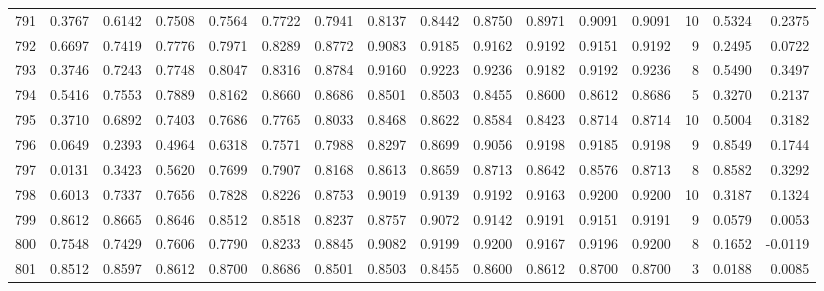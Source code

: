 \begin{tabular}{lrrrrrrrrrrrrrrr}
791 &      0.3767 &  0.6142 &  0.7508 &  0.7564 &  0.7722 &  0.7941 &  0.8137 &  0.8442 &  0.8750 &  0.8971 &   0.9091 &     0.9091 &     10 &                    0.5324 &                     0.2375 \\
792 &      0.6697 &  0.7419 &  0.7776 &  0.7971 &  0.8289 &  0.8772 &  0.9083 &  0.9185 &  0.9162 &  0.9192 &   0.9151 &     0.9192 &      9 &                    0.2495 &                     0.0722 \\
793 &      0.3746 &  0.7243 &  0.7748 &  0.8047 &  0.8316 &  0.8784 &  0.9160 &  0.9223 &  0.9236 &  0.9182 &   0.9192 &     0.9236 &      8 &                    0.5490 &                     0.3497 \\
794 &      0.5416 &  0.7553 &  0.7889 &  0.8162 &  0.8660 &  0.8686 &  0.8501 &  0.8503 &  0.8455 &  0.8600 &   0.8612 &     0.8686 &      5 &                    0.3270 &                     0.2137 \\
795 &      0.3710 &  0.6892 &  0.7403 &  0.7686 &  0.7765 &  0.8033 &  0.8468 &  0.8622 &  0.8584 &  0.8423 &   0.8714 &     0.8714 &     10 &                    0.5004 &                     0.3182 \\
796 &      0.0649 &  0.2393 &  0.4964 &  0.6318 &  0.7571 &  0.7988 &  0.8297 &  0.8699 &  0.9056 &  0.9198 &   0.9185 &     0.9198 &      9 &                    0.8549 &                     0.1744 \\
797 &      0.0131 &  0.3423 &  0.5620 &  0.7699 &  0.7907 &  0.8168 &  0.8613 &  0.8659 &  0.8713 &  0.8642 &   0.8576 &     0.8713 &      8 &                    0.8582 &                     0.3292 \\
798 &      0.6013 &  0.7337 &  0.7656 &  0.7828 &  0.8226 &  0.8753 &  0.9019 &  0.9139 &  0.9192 &  0.9163 &   0.9200 &     0.9200 &     10 &                    0.3187 &                     0.1324 \\
799 &      0.8612 &  0.8665 &  0.8646 &  0.8512 &  0.8518 &  0.8237 &  0.8757 &  0.9072 &  0.9142 &  0.9191 &   0.9151 &     0.9191 &      9 &                    0.0579 &                     0.0053 \\
800 &      0.7548 &  0.7429 &  0.7606 &  0.7790 &  0.8233 &  0.8845 &  0.9082 &  0.9199 &  0.9200 &  0.9167 &   0.9196 &     0.9200 &      8 &                    0.1652 &                    -0.0119 \\
801 &      0.8512 &  0.8597 &  0.8612 &  0.8700 &  0.8686 &  0.8501 &  0.8503 &  0.8455 &  0.8600 &  0.8612 &   0.8700 &     0.8700 &      3 &                    0.0188 &                     0.0085 \\

\end{tabular}
